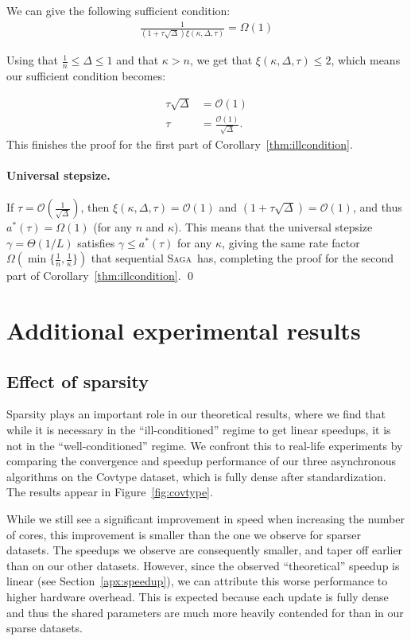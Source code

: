 \documentclass[twoside]{article}
\newcommand{\stepsize}{\gamma}
\newcommand{\overlap}{\tau}
\newcommand{\sparsity}{\Delta}
\newcommand{\SAGA}{\textsc{Saga}}
\begin{document}
We can give the following sufficient condition:
\begin{align}
\frac{1}{\left(1+ \overlap  \sqrt \sparsity \right) \xi(\kappa, \sparsity, \overlap)} = \Omega(1)
\end{align}

Using that $\frac{1}{n} \leq \sparsity \leq 1$ and that $\kappa > n$, we get that $\xi(\kappa, \sparsity, \overlap) \leq 2$, which means our sufficient condition becomes:

\begin{align}
\overlap \sqrt{\sparsity} &= \mathcal{O}(1)
\nonumber \\
\overlap &= \frac{\mathcal{O}(1)}{\sqrt{\sparsity}} .
\end{align}
This finishes the proof for the first part of Corollary~\ref{thm:illcondition}.	

\paragraph{Universal stepsize.} If $\overlap = \mathcal{O}(\frac{1}{\sqrt{\sparsity}})$, then $\xi(\kappa, \sparsity, \overlap) = \mathcal{O}(1)$ and $(1+\overlap \sqrt{\sparsity}) = \mathcal{O}(1)$, and thus $a^*(\overlap) = \Omega(1)$ (for any $n$ and $\kappa$). This means that the universal stepsize $\stepsize = \Theta(1/L)$ satisfies $\stepsize \leq a^*(\overlap)$ for any $\kappa$, giving the same rate factor $\Omega( \min\{\frac{1}{n}, \frac{1}{\kappa}\})$ that sequential \SAGA\ has, completing the proof for the second part of Corollary~\ref{thm:illcondition}. 
\qed

\section{Additional experimental results}\label{apx:AER}
\subsection{Effect of sparsity}
Sparsity plays an important role in our theoretical results, where we find that while it is necessary in the ``ill-conditioned'' regime to get linear speedups, it is not in the ``well-conditioned'' regime.
We confront this to real-life experiments by comparing the convergence and speedup performance of our three asynchronous algorithms on the Covtype dataset, which is fully dense after standardization.
The results appear in Figure~\ref{fig:covtype}.

While we still see a significant improvement in speed when increasing the number of cores, this improvement is smaller than the one we observe for sparser datasets.
The speedups we observe are consequently smaller, and taper off earlier than on our other datasets.
However, since the observed ``theoretical'' speedup is linear (see Section~\ref{apx:speedup}), we can attribute this worse performance to higher hardware overhead.
This is expected because each update is fully dense and thus the shared parameters are much more heavily contended for than in our sparse datasets.
\end{document}

